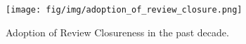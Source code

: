 \begin{figure}
    \centering
    \texttt{[image: fig/img/adoption\_of\_review\_closure.png]}
    \caption{Adoption of Review Closureness in the past decade. }
    \label{fig:adoption_of_review_closure}
\end{figure}